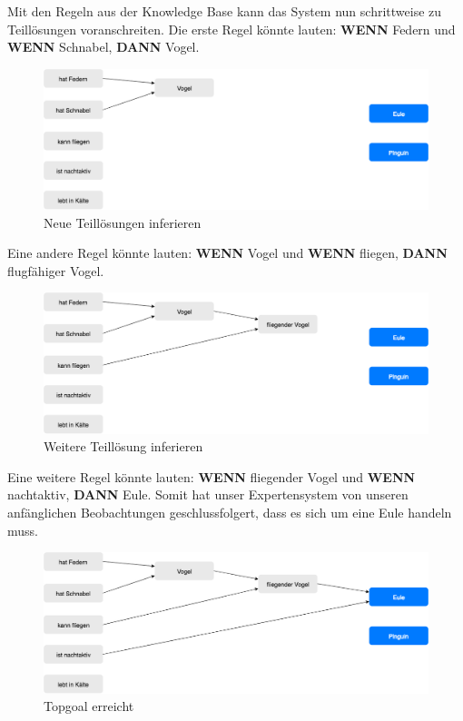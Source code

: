 \noindent Mit den Regeln aus der Knowledge Base kann das System nun schrittweise zu Teillösungen voranschreiten. Die erste Regel könnte lauten: \textbf{WENN} Federn und \textbf{WENN} Schnabel, \textbf{DANN} Vogel.
\begin{figure}[H]
    \centering
    \includegraphics[width=17cm]{chapters/expertensysteme/forward_chaining/forward_chaining_2}
    \caption{Neue Teillösungen inferieren}
    \label{fig:forward_chaining_2}
\end{figure}

\noindent Eine andere Regel könnte lauten: \textbf{WENN} Vogel und \textbf{WENN} fliegen, \textbf{DANN} flugfähiger Vogel.
\begin{figure}[H]
    \centering
    \includegraphics[width=17cm]{chapters/expertensysteme/forward_chaining/forward_chaining_3}
    \caption{Weitere Teillösung inferieren}
    \label{fig:forward_chaining_3}
\end{figure}

\clearpage
\noindent Eine weitere Regel könnte lauten: \textbf{WENN} fliegender Vogel und \textbf{WENN} nachtaktiv, \textbf{DANN} Eule. Somit hat unser Expertensystem von unseren anfänglichen Beobachtungen geschlussfolgert, dass es sich um eine Eule handeln muss.
\begin{figure}[H]
    \centering
    \includegraphics[width=17cm]{chapters/expertensysteme/forward_chaining/forward_chaining_4}
    \caption{Topgoal erreicht}
    \label{fig:forward_chaining_4}
\end{figure}

